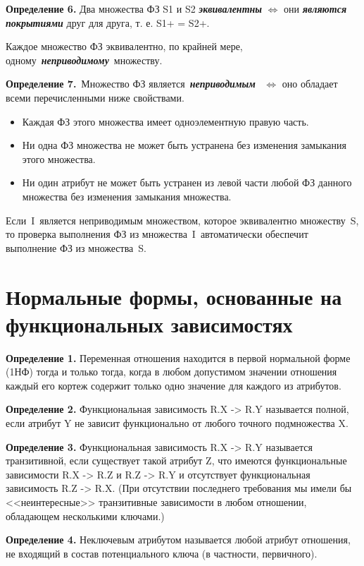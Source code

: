 \textbf{Определение 6.} Два множества ФЗ S1 и S2 \textit{\bfseries эквивалентны} $\Leftrightarrow$ они \textit{\bfseries являются покрытиями} друг для друга, т. е. S1+ = S2+.

Каждое множество ФЗ эквивалентно, по крайней мере, одному \textit{\bfseries неприводимому} множеству.

\textbf{Определение 7.} Множество ФЗ является \textit{\bfseries неприводимым}  $\Leftrightarrow$ оно обладает всеми перечисленными ниже свойствами.

\begin{itemize}[label*=--]
	\item Каждая ФЗ этого множества имеет одноэлементную правую часть.
	\item Ни одна ФЗ множества не может быть устранена без изменения замыкания этого множества.
	\item Ни один атрибут не может быть устранен из левой части любой ФЗ данного множества без изменения замыкания множества.
\end{itemize}

Если I является неприводимым множеством, которое эквивалентно множеству S, то проверка выполнения ФЗ из множества I автоматически обеспечит выполнение ФЗ из множества S.

\section{Нормальные формы, основанные на функциональных зависимостях}

\textbf{Определение 1.} Переменная отношения находится в первой нормальной форме (1НФ) тогда и только тогда, когда в любом допустимом значении отношения каждый его кортеж содержит только одно значение для каждого из атрибутов.

\textbf{Определение 2.} Функциональная зависимость R.X -> R.Y называется полной, если атрибут Y не зависит функционально от любого точного подмножества X.

\textbf{Определение 3.} Функциональная зависимость R.X -> R.Y называется транзитивной, если существует такой атрибут Z, что имеются функциональные зависимости R.X -> R.Z и R.Z -> R.Y и отсутствует функциональная зависимость R.Z -> R.X. 
(При отсутствии последнего требования мы имели бы <<неинтересные>> транзитивные зависимости в любом отношении, обладающем несколькими ключами.)

\textbf{Определение 4.} Неключевым атрибутом называется любой атрибут отношения, не входящий в состав потенциального ключа (в частности, первичного).

